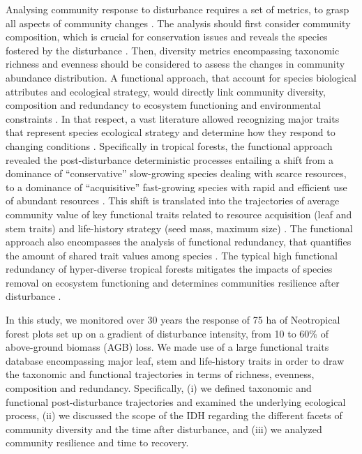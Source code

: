 \documentclass[fleqn,10pt]{ArtEcoFoG} %
\begin{document}
Analysing community response to disturbance requires a set of metrics,
to grasp all aspects of community changes
\citep{Sheil2003, Shea2004, Mayfield2010}. The analysis should first
consider community composition, which is crucial for conservation issues
and reveals the species fostered by the disturbance
\citep{Lavorel2002, Bellwood2006}. Then, diversity metrics encompassing
taxonomic richness and evenness should be considered to assess the
changes in community abundance distribution. A functional approach, that
account for species biological attributes and ecological strategy, would
directly link community diversity, composition and redundancy to
ecosystem functioning and environmental constraints
\citep{Violle2007b, Baraloto2012a}. In that respect, a vast literature
allowed recognizing major traits that represent species ecological
strategy and determine how they respond to changing conditions
\citep{Diaz2005}. Specifically in tropical forests, the functional
approach revealed the post-disturbance deterministic processes entailing
a shift from a dominance of ``conservative'' slow-growing species
dealing with scarce resources, to a dominance of ``acquisitive''
fast-growing species with rapid and efficient use of abundant resources
\citep{Rees2001, Reich2014, Herault2011}. This shift is translated into
the trajectories of average community value of key functional traits
related to resource acquisition (leaf and stem traits) and life-history
strategy (seed mass, maximum size)
\citep{Wright2004, TerSteege2006, Westoby2006a, Chave2009b}. The
functional approach also encompasses the analysis of functional
redundancy, that quantifies the amount of shared trait values among
species \citep{Carmona2016}. The typical high functional redundancy of
hyper-diverse tropical forests \citep{Bellwood2006} mitigates the
impacts of species removal on ecosystem functioning and determines
communities resilience after disturbance \citep{Elmqvist2003, Diaz2005}.

In this study, we monitored over 30 years the response of 75 ha of
Neotropical forest plots set up on a gradient of disturbance intensity,
from 10 to 60\% of above-ground biomass (AGB) loss. We made use of a
large functional traits database encompassing major leaf, stem and
life-history traits in order to draw the taxonomic and functional
trajectories in terms of richness, evenness, composition and redundancy.
Specifically, (i) we defined taxonomic and functional post-disturbance
trajectories and examined the underlying ecological process, (ii) we
discussed the scope of the IDH regarding the different facets of
community diversity and the time after disturbance, and (iii) we
analyzed community resilience and time to recovery.
\end{document}
